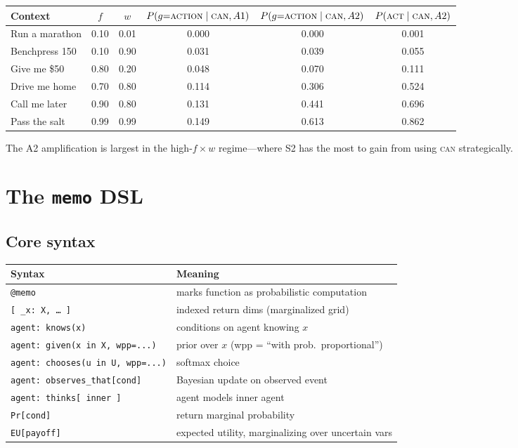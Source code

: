 \documentclass[11pt]{article}
\begin{document}
\begin{center}
\renewcommand{\arraystretch}{1.2}
\begin{tabular}{lccccc}
\toprule
\textbf{Context} & $f$ & $w$ & $P(g{=}\textsc{action} \mid \textsc{can}, A1)$ & $P(g{=}\textsc{action} \mid \textsc{can}, A2)$ & $P(\textsc{act} \mid \textsc{can}, A2)$ \\
\midrule
Run a marathon   & 0.10 & 0.01 & 0.000 & 0.000 & 0.001 \\
Benchpress 150   & 0.10 & 0.90 & 0.031 & 0.039 & 0.055 \\
Give me \$50     & 0.80 & 0.20 & 0.048 & 0.070 & 0.111 \\
Drive me home    & 0.70 & 0.80 & 0.114 & 0.306 & 0.524 \\
Call me later    & 0.90 & 0.80 & 0.131 & 0.441 & 0.696 \\
Pass the salt    & 0.99 & 0.99 & 0.149 & 0.613 & 0.862 \\
\bottomrule
\end{tabular}
\end{center}

The A2 amplification is largest in the high-$f \times w$ regime---where S2 has
the most to gain from using \textsc{can} strategically.

\section{The \texttt{memo} DSL}

\subsection{Core syntax}

\begin{center}
\renewcommand{\arraystretch}{1.4}
\begin{tabular}{ll}
\toprule
\textbf{Syntax} & \textbf{Meaning} \\
\midrule
\texttt{@memo} & marks function as probabilistic computation \\
\texttt{[\,\_x: X,\,\ldots\,]} & indexed return dims (marginalized grid) \\
\texttt{agent: knows(x)} & conditions on agent knowing $x$ \\
\texttt{agent: given(x in X, wpp=...)} & prior over $x$ (wpp = ``with prob.\ proportional'') \\
\texttt{agent: chooses(u in U, wpp=...)} & softmax choice \\
\texttt{agent: observes\_that[cond]} & Bayesian update on observed event \\
\texttt{agent: thinks[\,inner\,]} & agent models inner agent \\
\texttt{Pr[cond]} & return marginal probability \\
\texttt{EU[payoff]} & expected utility, marginalizing over uncertain vars \\
\bottomrule
\end{tabular}
\end{center}
\end{document}
